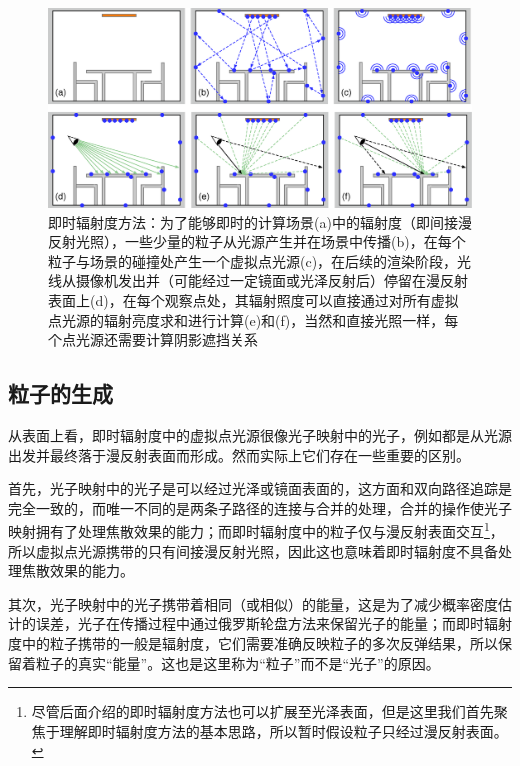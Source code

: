 \begin{figure}
\begin{fullwidth}
	\includegraphics[width=1.0\thewidth ]{figures/ir/instant-radiosity}
	\caption{即时辐射度方法：为了能够即时的计算场景(a)中的辐射度（即间接漫反射光照），一些少量的粒子从光源产生并在场景中传播(b)，在每个粒子与场景的碰撞处产生一个虚拟点光源(c)，在后续的渲染阶段，光线从摄像机发出并（可能经过一定镜面或光泽反射后）停留在漫反射表面上(d)，在每个观察点处，其辐射照度可以直接通过对所有虚拟点光源的辐射亮度求和进行计算(e)和(f)，当然和直接光照一样，每个点光源还需要计算阴影遮挡关系}
	\label{f:ir-instant-radiosity}
\end{fullwidth}
\end{figure}




\subsection{粒子的生成}
从表面上看，即时辐射度中的虚拟点光源很像光子映射中的光子，例如都是从光源出发并最终落于漫反射表面而形成。然而实际上它们存在一些重要的区别。

首先，光子映射中的光子是可以经过光泽或镜面表面的，这方面和双向路径追踪是完全一致的，而唯一不同的是两条子路径的连接与合并的处理，合并的操作使光子映射拥有了处理焦散效果的能力；而即时辐射度中的粒子仅与漫反射表面交互\footnote{尽管后面介绍的即时辐射度方法也可以扩展至光泽表面，但是这里我们首先聚焦于理解即时辐射度方法的基本思路，所以暂时假设粒子只经过漫反射表面。}，所以虚拟点光源携带的只有间接漫反射光照，因此这也意味着即时辐射度不具备处理焦散效果的能力。

其次，光子映射中的光子携带着相同（或相似）的能量，这是为了减少概率密度估计的误差，光子在传播过程中通过俄罗斯轮盘方法来保留光子的能量；而即时辐射度中的粒子携带的一般是辐射度，它们需要准确反映粒子的多次反弹结果，所以保留着粒子的真实“能量”。这也是这里称为“粒子”而不是“光子”的原因。


